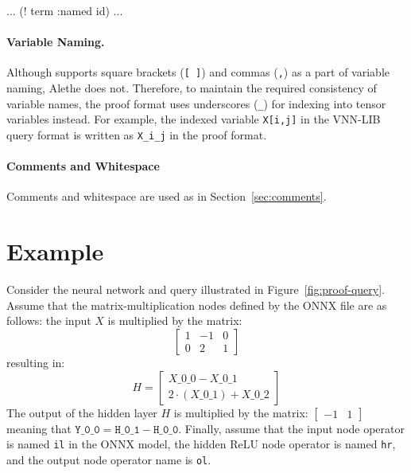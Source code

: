 \begin{code}[style=lbnf]
	... (! term :named id) ...
\end{code}


\paragraph{Variable Naming.} Although \vnnlib{} supports square brackets (\texttt{[ ]}) and commas (\texttt{,}) as a part of variable naming, Alethe does not. Therefore, to maintain the required consistency of variable names, the proof format uses underscores (\texttt{\_}) for indexing into tensor variables instead. For example, the indexed variable \texttt{X[i,j]} in the VNN-LIB query format is written as \texttt{X\_i\_j} in the proof format.


\paragraph{Comments and Whitespace}
Comments and whitespace are used as in Section~\ref{sec:comments}.


\section{Example}
\label{sec:proof-example}

Consider the neural network and \vnnlib{} query illustrated in Figure~\ref{fig:proof-query}. Assume that the matrix-multiplication nodes defined by the ONNX file are as follows: the input $X$ is multiplied by the matrix:
$$\begin{bmatrix} 1 & -1 & 0 
\\
0 & 2 & 1 
 \end{bmatrix}$$
resulting in: $$H = \begin{bmatrix} X\_0\_0 - X\_0\_1 
	\\
	2\cdot(X\_0\_1) + X\_0\_2
\end{bmatrix}$$
The output of the hidden layer $H$ is multiplied by the matrix:
$\begin{bmatrix} -1 & 1
\end{bmatrix}$ meaning that $\texttt{Y\_0\_0} = \texttt{H\_0\_1} - \texttt{H\_0\_0}$.
Finally, assume that the input node operator is named \texttt{il} in the ONNX model, the hidden ReLU node operator is named \texttt{hr}, and the output node operator name is \texttt{ol}.

